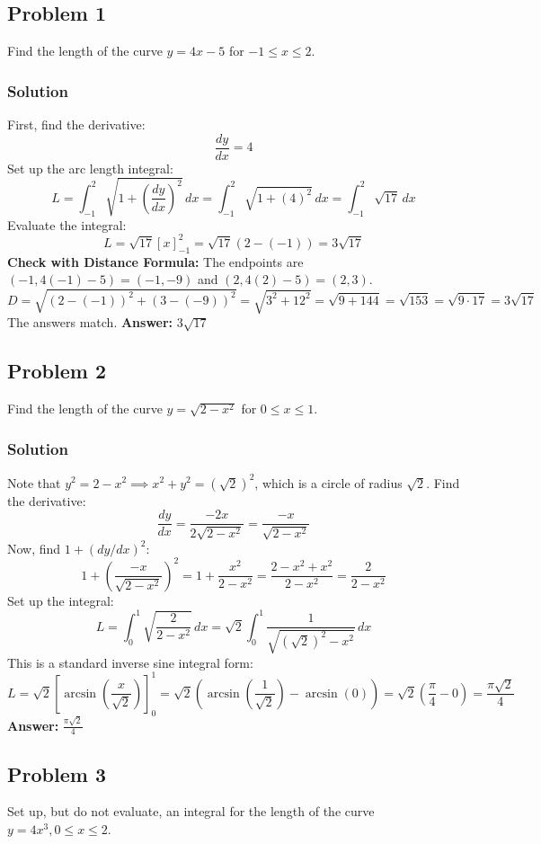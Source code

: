 \documentclass{article}
\begin{document}
\subsection{Problem 1}
Find the length of the curve $ y = 4x - 5 $ for $ -1 \le x \le 2 $.
\subsubsection*{Solution}
First, find the derivative:
\[ \frac{dy}{dx} = 4 \]
Set up the arc length integral:
\[ L = \int_{-1}^{2} \sqrt{1 + \left(\frac{dy}{dx}\right)^2} \,dx = \int_{-1}^{2} \sqrt{1 + (4)^2} \,dx = \int_{-1}^{2} \sqrt{17} \,dx \]
Evaluate the integral:
\[ L = \sqrt{17} [x]_{-1}^{2} = \sqrt{17}(2 - (-1)) = 3\sqrt{17} \]
\textbf{Check with Distance Formula:} The endpoints are $(-1, 4(-1)-5) = (-1, -9)$ and $(2, 4(2)-5) = (2, 3)$.
\[ D = \sqrt{(2 - (-1))^2 + (3 - (-9))^2} = \sqrt{3^2 + 12^2} = \sqrt{9 + 144} = \sqrt{153} = \sqrt{9 \cdot 17} = 3\sqrt{17} \]
The answers match.
\textbf{Answer:} $ 3\sqrt{17} $

\subsection{Problem 2}
Find the length of the curve $ y = \sqrt{2-x^2} $ for $ 0 \le x \le 1 $.
\subsubsection*{Solution}
Note that $ y^2 = 2-x^2 \implies x^2+y^2 = (\sqrt{2})^2 $, which is a circle of radius $ \sqrt{2} $.
Find the derivative:
\[ \frac{dy}{dx} = \frac{-2x}{2\sqrt{2-x^2}} = \frac{-x}{\sqrt{2-x^2}} \]
Now, find $ 1 + (dy/dx)^2 $:
\[ 1 + \left(\frac{-x}{\sqrt{2-x^2}}\right)^2 = 1 + \frac{x^2}{2-x^2} = \frac{2-x^2+x^2}{2-x^2} = \frac{2}{2-x^2} \]
Set up the integral:
\[ L = \int_{0}^{1} \sqrt{\frac{2}{2-x^2}} \,dx = \sqrt{2} \int_{0}^{1} \frac{1}{\sqrt{(\sqrt{2})^2 - x^2}} \,dx \]
This is a standard inverse sine integral form:
\[ L = \sqrt{2} \left[ \arcsin\left(\frac{x}{\sqrt{2}}\right) \right]_{0}^{1} = \sqrt{2} \left( \arcsin\left(\frac{1}{\sqrt{2}}\right) - \arcsin(0) \right) = \sqrt{2} \left( \frac{\pi}{4} - 0 \right) = \frac{\pi\sqrt{2}}{4} \]
\textbf{Answer:} $ \frac{\pi\sqrt{2}}{4} $

\subsection{Problem 3}
Set up, but do not evaluate, an integral for the length of the curve $ y = 4x^3, 0 \le x \le 2 $.
\end{document}
